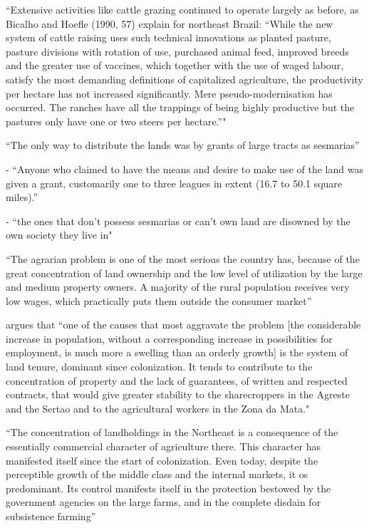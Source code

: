 \documentclass{article}
\begin{document}
\parencite{Carlson2019-mk} ``Extensive  activities  like  
cattle grazing continued to operate largely as before, as Bicalho and Hoefle (1990, 57) explain for northeast  Brazil: “While the new system of cattle raising uses such technical innovations as planted pasture, pasture  divisions with rotation of use, purchased animal feed, improved breeds and the greater use of vaccines, which  together  with  the  use  of  waged  labour,  satisfy  the  most  demanding  definitions  of  capitalized  agriculture,   the productivity per hectare has not increased significantly. Mere pseudo-modernisation has occurred. The  ranches have all the trappings of being highly productive but the pastures only have one or two steers per  hectare.”"

\textcite{Diegues_Junior1959-ba}

\textcite{Smith1944-oi} ``The only way to distribute the lands was by grants of large tracts as sesmarias''

\textcite{Dean1971-iq} - ``Anyone who claimed to have the means and desire to make use of the land was given a grant, customarily one to three leagues in extent (16.7 to 50.1 square miles).''

\textcite{Simonsen2005-ps} - ``the ones that don't possess sesmarias or can't own land are disowned by the own society they live in"

\textcite[p.~1]{De_Oliveira_Andrade1980-xz}
``The agrarian problem is one of the most serious the country has, because of the great concentration of land ownership and the low level of utilization by the large and medium property owners. A majority of the rural population receives very low wages, which practically puts them outside the consumer market''

\textcite[p.~34-35]{De_Oliveira_Andrade1980-xz} argues that 
``one of the causes that most aggravate the problem [the considerable increase in population, without a corresponding increase in possibilities for employment, is much more a swelling than an orderly growth] is the system of land tenure, dominant since colonization. It tends to contribute to the concentration of property and the lack of guarantees, of written and respected contracts, that would give greater stability to the sharecroppers in the Agreste and the Sertao and to the agricultural workers in the Zona da Mata."

\textcite[p.~36]{De_Oliveira_Andrade1980-xz}
``The concentration of landholdings in the Northeast is a consequence of the essentially commercial character of agriculture there. This character has manifested itself since the start of colonization. Even today, despite the perceptible growth of the middle class and the internal markets, it os predominant. Its control manifests itself in the protection bestowed by the government agencies on the large farms, and in the complete disdain for subsistence farming''
\end{document}
